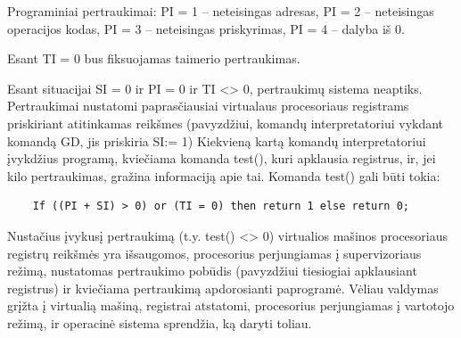 \begin{description}
\begin{description}
    \item Programiniai pertraukimai: PI = 1 – neteisingas adresas, PI = 2 – neteisingas operacijos kodas, PI = 3 – neteisingas priskyrimas, PI = 4 – dalyba iš 0.
    \item Esant TI = 0 bus fiksuojamas taimerio pertraukimas.
    \end{description}
Esant situacijai SI = 0 ir PI = 0 ir TI <> 0, pertraukimų sistema neaptiks. Pertraukimai nustatomi paprasčiausiai virtualaus procesoriaus registrams priskiriant atitinkamas reikšmes (pavyzdžiui, komandų interpretatoriui vykdant komandą GD, jis priskiria SI:= 1) Kiekvieną kartą komandų interpretatoriui įvykdžius programą, kviečiama komanda test(), kuri apklausia registrus, ir, jei kilo pertraukimas, gražina informaciją apie tai. Komanda test() gali būti tokia:
\begin{verbatim}
    If ((PI + SI) > 0) or (TI = 0) then return 1 else return 0;
\end{verbatim}
Nustačius įvykusį pertraukimą (t.y. test() <> 0) virtualios mašinos procesoriaus registrų reikšmės yra išsaugomos, procesorius perjungiamas į supervizoriaus režimą, nustatomas pertraukimo pobūdis (pavyzdžiui tiesiogiai apklausiant registrus) ir kviečiama pertraukimą apdorosianti paprogramė. Vėliau valdymas grįžta į virtualią mašiną, registrai atstatomi, procesorius perjungiamas į vartotojo režimą, ir operacinė sistema sprendžia, ką daryti toliau.
\end{description}

